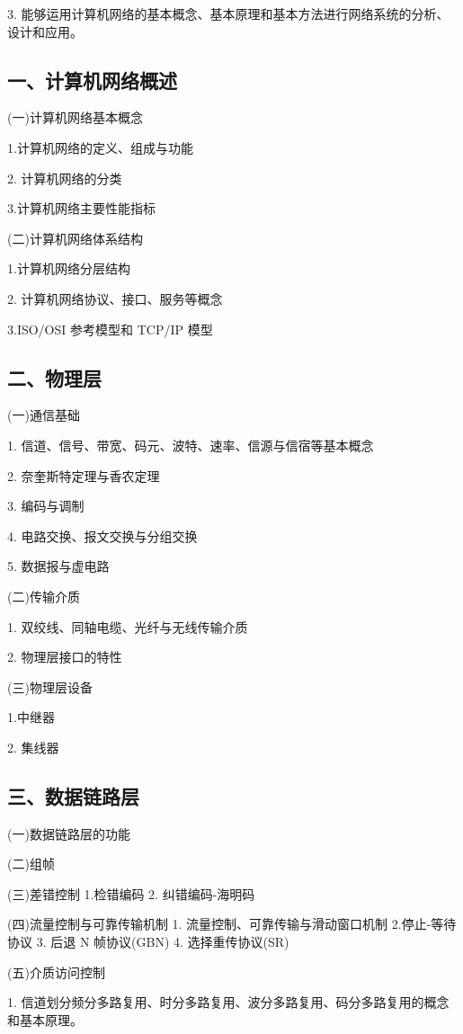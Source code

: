 \documentclass[10pt]{article}
\begin{document}
3. 能够运用计算机网络的基本概念、基本原理和基本方法进行网络系统的分析、设计和应用。

\subsection*{一、计算机网络概述}

(一)计算机网络基本概念

1.计算机网络的定义、组成与功能

2. 计算机网络的分类

3.计算机网络主要性能指标

(二)计算机网络体系结构

1.计算机网络分层结构

2. 计算机网络协议、接口、服务等概念

3.ISO/OSI 参考模型和 TCP/IP 模型

\subsection*{二、物理层}

(一)通信基础

1. 信道、信号、带宽、码元、波特、速率、信源与信宿等基本概念

2. 奈奎斯特定理与香农定理

3. 编码与调制

4. 电路交换、报文交换与分组交换

5. 数据报与虚电路

(二)传输介质

1. 双绞线、同轴电缆、光纤与无线传输介质 

2. {\color{red} 物理层接口的特性}

(三)物理层设备

1.中继器 

2. 集线器

\subsection*{三、数据链路层}

(一)数据链路层的功能

(二)组帧 

(三)差错控制 1.检错编码 2.{\color{red} 纠错编码-海明码}

(四)流量控制与可靠传输机制 1. 流量控制、可靠传输与滑动窗口机制 2.停止-等待协议 3. 后退 N 帧协议(GBN) 4. 选择重传协议(SR)

(五)介质访问控制 

1. {\color{red}信道划分频分多路复用、时分多路复用、波分多路复用、码分多路复用的概念和基本原理}。 
\end{document}
